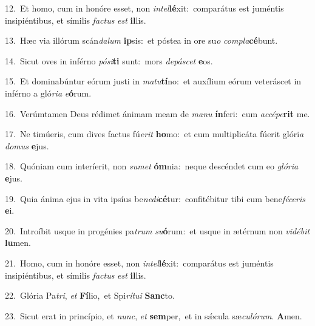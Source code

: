 {\numbfont\textcolor{\numbcolor}{12.}}~Et homo, cum in honóre esset, non \textit{in}\-\textit{tel}\textbf{lé}xit:~\star comparátus est juméntis insipiéntibus, et símilis \textit{fac}\-\textit{tus} \textit{est} \textbf{il}\-lis.\par
{\numbfont\textcolor{\numbcolor}{13.}}~Hæc via illórum scán\-\textit{da}\-\textit{lum} \textbf{ip}\-sis:~\star et póstea in ore su\textit{o} \textit{com}\-\textit{pla}\textbf{cé}bunt.\par
{\numbfont\textcolor{\numbcolor}{14.}}~Sicut oves in inférno \textit{pó}\-\textit{si}\textbf{ti} sunt:~\star mors \textit{de}\-\textit{pá}\textit{scet} \textbf{e}\-os.\par
{\numbfont\textcolor{\numbcolor}{15.}}~Et dominabúntur eórum justi in \textit{ma}\-\textit{tu}\textbf{tí}no:~\star et auxílium eórum veteráscet in inférno a gló\-\textit{ri}\-\textit{a} \textit{e}\-\textbf{ó}rum.\par
{\numbfont\textcolor{\numbcolor}{16.}}~Verúmtamen Deus rédimet ánimam meam de \textit{ma}\-\textit{nu} \textbf{ín}\-feri:~\star cum \textit{ac}\-\textit{cé}\textit{pe}\textbf{rit} me.\par
{\numbfont\textcolor{\numbcolor}{17.}}~Ne timúeris, cum dives factus fú\-\textit{e}\-\textit{rit} \textbf{ho}\-mo:~\star et cum multiplicáta fúerit glóri\textit{a} \textit{do}\-\textit{mus} \textbf{e}\-jus.\par
{\numbfont\textcolor{\numbcolor}{18.}}~Quóniam cum interíerit, non \textit{su}\-\textit{met} \textbf{óm}\-nia:~\star neque descéndet cum eo \textit{gló}\-\textit{ri}\textit{a} \textbf{e}\-jus.\par
{\numbfont\textcolor{\numbcolor}{19.}}~Quia ánima ejus in vita ipsíus be\-\textit{ne}\-\textit{di}\textbf{cé}tur:~\star confitébitur tibi cum bene\-\textit{fé}\-\textit{ce}\textit{ris} \textbf{e}\-i.\par
{\numbfont\textcolor{\numbcolor}{20.}}~Introíbit usque in progénies pa\textit{trum} \textit{su}\-\textbf{ó}rum:~\star et usque in ætérnum non \textit{vi}\-\textit{dé}\textit{bit} \textbf{lu}\-men.\par
{\numbfont\textcolor{\numbcolor}{21.}}~Homo, cum in honóre esset, non \textit{in}\-\textit{tel}\textbf{lé}xit:~\star comparátus est juméntis insipiéntibus, et símilis \textit{fac}\-\textit{tus} \textit{est} \textbf{il}\-lis.\par
{\numbfont\textcolor{\numbcolor}{22.}}~Glória Pa\-\textit{tri}\-, \textit{et} \textbf{Fí}\-lio,~\star et Spi\-\textit{rí}\-\textit{tu}\textit{i} \textbf{Sanc}\-to.\par
{\numbfont\textcolor{\numbcolor}{23.}}~Sicut erat in princípio, et \textit{nunc}\-, \textit{et} \textbf{sem}\-per,~\star et in sǽcula sæ\-\textit{cu}\-\textit{ló}\textit{rum}. \textbf{A}\-men.\par
